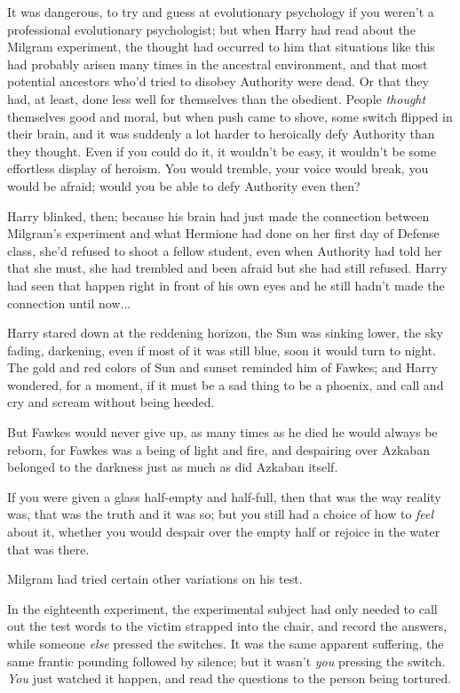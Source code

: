 It was dangerous, to try and guess at evolutionary psychology if you weren't a professional evolutionary psychologist; but when Harry had read about the Milgram experiment, the thought had occurred to him that situations like this had probably arisen many times in the ancestral environment, and that most potential ancestors who'd tried to disobey Authority were dead. Or that they had, at least, done less well for themselves than the obedient. People \emph{thought} themselves good and moral, but when push came to shove, some switch flipped in their brain, and it was suddenly a lot harder to heroically defy Authority than they thought. Even if you could do it, it wouldn't be easy, it wouldn't be some effortless display of heroism. You would tremble, your voice would break, you would be afraid; would you be able to defy Authority even then?

Harry blinked, then; because his brain had just made the connection between Milgram's experiment and what Hermione had done on her first day of Defense class, she'd refused to shoot a fellow student, even when Authority had told her that she must, she had trembled and been afraid but she had still refused. Harry had seen that happen right in front of his own eyes and he still hadn't made the connection until now...

Harry stared down at the reddening horizon, the Sun was sinking lower, the sky fading, darkening, even if most of it was still blue, soon it would turn to night. The gold and red colors of Sun and sunset reminded him of Fawkes; and Harry wondered, for a moment, if it must be a sad thing to be a phoenix, and call and cry and scream without being heeded.

But Fawkes would never give up, as many times as he died he would always be reborn, for Fawkes was a being of light and fire, and despairing over Azkaban belonged to the darkness just as much as did Azkaban itself.

If you were given a glass half-empty and half-full, then that was the way reality was, that was the truth and it was so; but you still had a choice of how to \emph{feel} about it, whether you would despair over the empty half or rejoice in the water that was there.

Milgram had tried certain other variations on his test.

In the eighteenth experiment, the experimental subject had only needed to call out the test words to the victim strapped into the chair, and record the answers, while someone \emph{else} pressed the switches. It was the same apparent suffering, the same frantic pounding followed by silence; but it wasn't \emph{you} pressing the switch. \emph{You} just watched it happen, and read the questions to the person being tortured.

